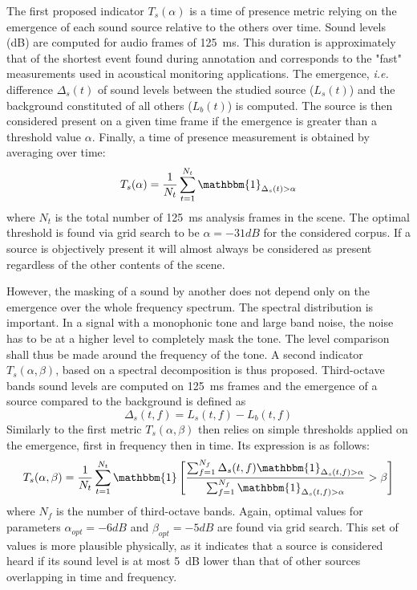 \documentclass{article}
\begin{document}
\begin{sloppy}
The first proposed indicator $T_s(\alpha)$ is a time of presence metric relying on the emergence of each sound source relative to the others over time. Sound levels (dB) are computed for audio frames of 125~ms. This duration is approximately that of the shortest event found during annotation and corresponds to the "fast" measurements used in acoustical monitoring applications. The emergence, \textit{i.e.} difference $\Delta_s(t)$ of sound levels between the studied source ($L_s(t)$) and the background constituted of all others ($L_b(t)$) is computed. The source is then considered present on a given time frame if the emergence is greater than a threshold value $\alpha$. Finally, a time of presence measurement is obtained by averaging over time:
\begin{equation}
T_s(\alpha) = \frac{1}{N_t}\sum_{t = 1}^{N_t}\mathbbm{1}_{\Delta_s(t)>\alpha}
\end{equation}
where $N_t$ is the total number of 125~ms analysis frames in the scene. The optimal threshold is found via grid search to be $\alpha = -31dB$ for the considered corpus. If a source is objectively present it will almost always be considered as present regardless of the other contents of the scene.

However, the masking of a sound by another does not depend only on the emergence over the whole frequency spectrum. The spectral distribution is important. In a signal with a monophonic tone and large band noise, the noise has to be at a higher level to completely mask the tone. The level comparison shall thus be made around the frequency of the tone. A second indicator $T_s(\alpha, \beta)$, based on a spectral decomposition is thus proposed. Third-octave bands sound levels are computed on 125~ms frames and the emergence of a source compared to the background is defined as
\begin{equation}
\Delta_s(t, f) = L_s(t, f) - L_b(t, f)
\end{equation}
Similarly to the first metric $T_s(\alpha, \beta)$ then relies on simple thresholds applied on the emergence, first in frequency then in time. Its expression is as follows:
\begin{equation}
T_s(\alpha, \beta) = \frac{1}{N_t}\sum_{t = 1}^{N_t}\mathbbm{1}\left[ \frac{\sum_{f = 1}^{N_f}\Delta_s(t, f)\mathbbm{1}_{\Delta_s(t, f)>\alpha}}{\sum_{f = 1}^{N_f}\mathbbm{1}_{\Delta_s(t, f)>\alpha}}>\beta \right]
\end{equation}
where $N_f$ is the number of third-octave bands. Again, optimal values for parameters $\alpha_{opt} = -6 dB$ and $\beta_{opt} = -5 dB$ are found via grid search. This set of values is more plausible physically, as it indicates that a source is considered heard if its sound level is at most 5~dB lower than that of other sources overlapping in time and frequency.


\end{sloppy}
\end{document}
